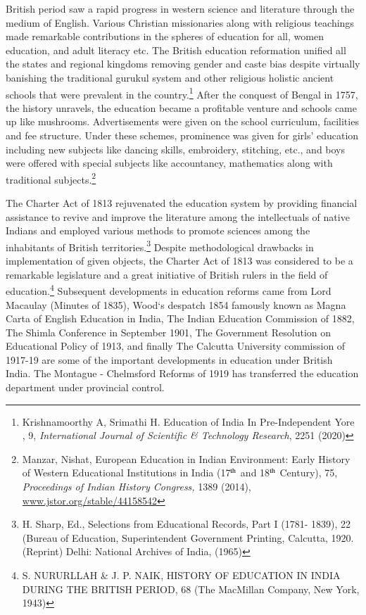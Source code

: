 \begin{multicols}{2}
\noi
British period saw a rapid progress in western science and literature through the medium of
English. Various Christian missionaries along with religious teachings made remarkable
contributions in the spheres of education for all, women education, and adult literacy etc. The
British education reformation unified all the states and regional kingdoms removing gender
and caste bias despite virtually banishing the traditional gurukul system and other religious
holistic ancient schools that were prevalent in the country.\footnote{Krishnamoorthy A, Srimathi H. Education of India In Pre-Independent Yore , 9, \textit{International Journal of Scientific \& Technology Research}, 2251 (2020)} After the conquest of Bengal in 1757, the history unravels, the education became a profitable venture and schools came up
like mushrooms. Advertisements were given on the school curriculum, facilities and fee
structure. Under these schemes, prominence was given for girls’ education including new
subjects like dancing skills, embroidery, stitching, etc., and boys were offered with special
subjects like accountancy, mathematics along with traditional subjects.\footnote{Manzar, Nishat, European Education in Indian Environment: Early History of Western Educational Institutions in India (17$^{\rm th}$ and 18$^{\rm th}$ Century), 75, \textit{Proceedings of Indian History Congress,} 1389 (2014), \url{www.jstor.org/stable/44158542}}

\noi
The Charter Act of 1813 rejuvenated the education system by providing financial assistance
to revive and improve the literature among the intellectuals of native Indians and employed
various methods to promote sciences among the inhabitants of British territories.\footnote{H. Sharp, Ed., Selections from Educational Records, Part I (1781- 1839), 22 (Bureau of Education, Superintendent Government Printing, Calcutta, 1920. (Reprint) Delhi: National Archives of India, (1965)} Despite methodological drawbacks in implementation of given objects, the Charter Act of 1813 was considered to be a remarkable legislature and a great initiative of British rulers in the field of education.\footnote{S. NURURLLAH \& J. P. NAIK, HISTORY OF EDUCATION IN INDIA DURING THE BRITISH
PERIOD, 68 (The MacMillan Company, New York, 1943)} Subsequent developments in education reforms came from Lord Macaulay (Minutes of 1835), Wood‘s despatch 1854 famously known as Magna Carta of English
Education in India, The Indian Education Commission of 1882, The Shimla Conference in
September 1901, The Government Resolution on Educational Policy of 1913, and finally The
Calcutta University commission of 1917-19 are some of the important developments in
education under British India. The Montague - Chelmsford Reforms of 1919 has transferred
the education department under provincial control.


\end{multicols}
